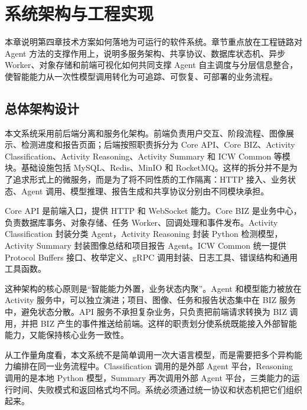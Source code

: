 \chapter{系统架构与工程实现}
\label{chap:architecture-implementation}

本章说明第四章技术方案如何落地为可运行的软件系统。章节重点放在工程链路对 Agent 方法的支撑作用上，说明多服务架构、共享协议、数据库状态机、异步 Worker、对象存储和前端可视化如何共同支撑 Agent 自主调度与分层信息整合，使智能能力从一次性模型调用转化为可追踪、可恢复、可部署的业务流程。

\section{总体架构设计}
\label{sec:impl-overall-architecture}

本文系统采用前后端分离和服务化架构。前端负责用户交互、阶段流程、图像展示、检测进度和报告页面；后端按照职责拆分为 Core API、Core BIZ、Activity Classification、Activity Reasoning、Activity Summary 和 ICW Common 等模块。基础设施包括 MySQL、Redis、MinIO 和 RocketMQ。这样的拆分并不是为了追求形式上的微服务，而是为了将不同性质的工作隔离：HTTP 接入、业务状态、Agent 调用、模型推理、报告生成和共享协议分别由不同模块承担。

Core API 是前端入口，提供 HTTP 和 WebSocket 能力。Core BIZ 是业务中心，负责数据库事务、对象存储、任务 Worker、回调处理和事件发布。Activity Classification 封装分类 Agent，Activity Reasoning 封装 Python 检测模型，Activity Summary 封装图像总结和项目报告 Agent。ICW Common 统一提供 Protocol Buffers 接口、枚举定义、gRPC 调用封装、日志工具、错误结构和通用工具函数。

这种架构的核心原则是“智能能力外置，业务状态内聚”。Agent 和模型能力被放在 Activity 服务中，可以独立演进；项目、图像、任务和报告状态集中在 BIZ 服务中，避免状态分散。API 服务不承担复杂业务，只负责把前端请求转换为 BIZ 调用，并把 BIZ 产生的事件推送给前端。这样的职责划分使系统既能接入外部智能能力，又能保持核心业务一致性。

从工作量角度看，本文系统不是简单调用一次大语言模型，而是需要把多个异构能力编排在同一业务流程中。Classification 调用的是外部 Agent 平台，Reasoning 调用的是本地 Python 模型，Summary 再次调用外部 Agent 平台，三类能力的运行时间、失败模式和返回格式均不同。系统必须通过统一协议和状态机把它们组织起来。

